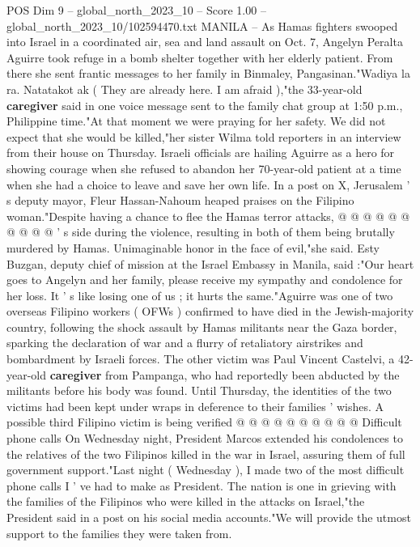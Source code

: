 \begin{textsample}{POS Dim 9 – global\_north\_2023\_10 – Score 1.00 – global\_north\_2023\_10/102594470.txt}  \label{ex:f9_pos_306}
MANILA -- As Hamas fighters swooped into Israel in a coordinated air, sea and land assault on Oct. 7, Angelyn Peralta Aguirre took refuge in a bomb shelter together with her elderly patient.
From there she sent frantic messages to her family in Binmaley, Pangasinan."Wadiya la ra.
Natatakot ak ( They are already here.
I am afraid ),"the 33-year-old \textbf{caregiver} said in one voice message sent to the family chat group at 1:50 p.m., Philippine time."At that moment we were praying for her safety.
We did not expect that she would be killed,"her sister Wilma told reporters in an interview from their house on Thursday.
Israeli officials are hailing Aguirre as a hero for showing courage when she refused to abandon her 70-year-old patient at a time when she had a choice to leave and save her own life.
In a post on X, Jerusalem ' s deputy mayor, Fleur Hassan-Nahoum heaped praises on the Filipino woman."Despite having a chance to flee the Hamas terror attacks, @ @ @ @ @ @ @ @ @ @ ' s side during the violence, resulting in both of them being brutally murdered by Hamas.
Unimaginable honor in the face of evil,"she said.
Esty Buzgan, deputy chief of mission at the Israel Embassy in Manila, said :"Our heart goes to Angelyn and her family, please receive my sympathy and condolence for her loss.
It ' s like losing one of us ; it hurts the same."Aguirre was one of two overseas Filipino workers ( OFWs ) confirmed to have died in the Jewish-majority country, following the shock assault by Hamas militants near the Gaza border, sparking the declaration of war and a flurry of retaliatory airstrikes and bombardment by Israeli forces.
The other victim was Paul Vincent Castelvi, a 42-year-old \textbf{caregiver} from Pampanga, who had reportedly been abducted by the militants before his body was found.
Until Thursday, the identities of the two victims had been kept under wraps in deference to their families ' wishes.
A possible third Filipino victim is being verified @ @ @ @ @ @ @ @ @ @ Difficult phone calls On Wednesday night, President Marcos extended his condolences to the relatives of the two Filipinos killed in the war in Israel, assuring them of full government support."Last night ( Wednesday ), I made two of the most difficult phone calls I ' ve had to make as President.
The nation is one in grieving with the families of the Filipinos who were killed in the attacks on Israel,"the President said in a post on his social media accounts."We will provide the utmost support to the families they were taken from.

\end{textsample}
